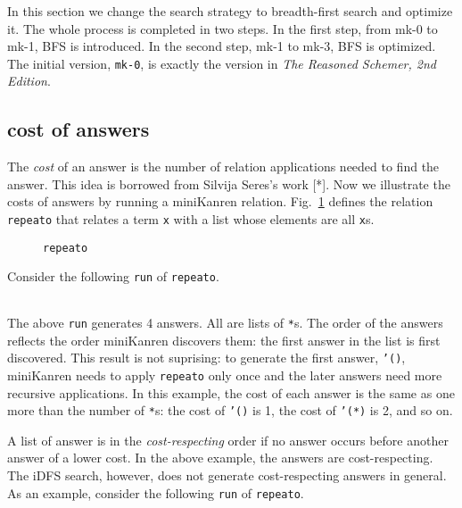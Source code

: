 \documentclass[format=acmlarge, review=true, authordraft=true]{acmart}
\begin{document}
In this section we change the search strategy to breadth-first search and 
optimize it. The whole process is completed in two steps. In the first step, 
from mk-0 to mk-1, BFS is introduced. In the second step, mk-1 to mk-3, BFS is 
optimized. The initial version, \texttt{mk-0}, is exactly the version in 
\emph{The Reasoned Schemer, 2nd Edition}.

\subsection{cost of answers}


The \emph{cost} of an answer is the number of relation applications needed to
find the answer. This idea is borrowed from Silvija Seres's work [*].
Now we illustrate the costs of answers by running a miniKanren relation.
Fig.~\ref{def-repeato} defines the relation \texttt{repeato} that 
relates a term \texttt{x} with a list whose elements are all \texttt{x}s.

\begin{figure}
  
  \caption{\texttt{repeato}}
  \label{def-repeato}
\end{figure}

Consider the following \texttt{run} of \texttt{repeato}.
\begin{center}
  \begin{tabular}{c}
  
   \end{tabular}
\end{center}

The above \texttt{run} generates 4 answers. All are lists of \texttt{*}s.
The order of the answers reflects the order miniKanren discovers them:
the first answer in the list is first discovered. This result is not suprising:
to generate the first answer, \texttt{'()}, miniKanren needs to apply
\texttt{repeato} only once and the later answers need more recursive
applications. In this example, the cost of each answer is the same as
one more than the number of \texttt{*}s: the cost of \texttt{'()} is 1,
the cost of \texttt{'(*)} is 2, and so on.

A list of answer is in the \emph{cost-respecting} order if no answer occurs
before another answer of a lower cost. In the above example, the answers are
cost-respecting. The iDFS search, however, does not generate cost-respecting
answers in general. As an example, consider the following \texttt{run} of
\texttt{repeato}.
\begin{center}
  \begin{tabular}{c}
   
   \end{tabular}
\end{center}
\end{document}
